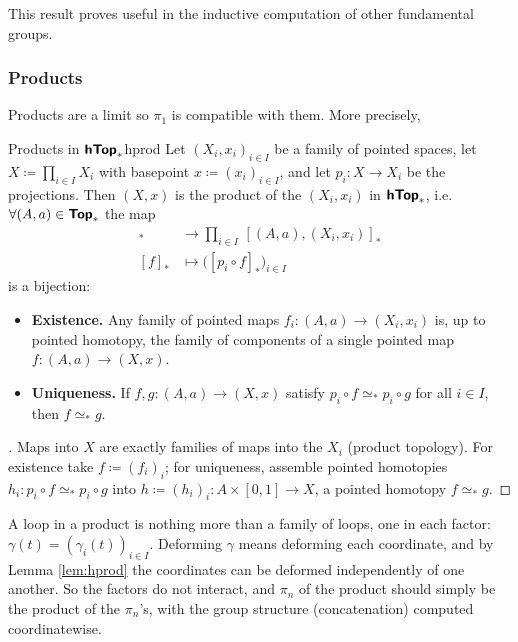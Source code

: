 This result proves useful in the inductive computation of other fundamental groups.

\subsubsection{Products}

Products are a limit so $\pi_1$ is compatible with them. More precisely,

\begin{lemma}{Products in $\bm{\mathsf{hTop}}_*$}{hprod}
  Let $(X_i,x_i)_{i\in I}$ be a family of pointed spaces, let $X\coloneq\prod_{i\in I}X_i$ with basepoint $x\coloneq(x_i)_{i\in I}$, and let $p_i:X\to X_i$ be the projections. Then $(X,x)$ is the product of the $(X_i,x_i)$ in $\bm{\mathsf{hTop}}_*$, i.e.\ $\forall (A,a)\in \bm{\mathsf{Top}}_*$ the map
  \begin{align*}
    [(A,a),(X,x)]_* &\to \prod_{i\in I}\,[(A,a),(X_i,x_i)]_* \\
    [f]_* &\mapsto \big([p_i\circ f]_*\big)_{i\in I}
  \end{align*}
  is a bijection:
  \begin{itemize}
    \item \textbf{Existence.} Any family of pointed maps $f_i:(A,a)\to(X_i,x_i)$ is, up to pointed homotopy, the family of components of a single pointed map $f:(A,a)\to(X,x)$.
    \item \textbf{Uniqueness.} If $f,g:(A,a)\to(X,x)$ satisfy $p_i\circ f\simeq_* p_i\circ g$ for all $i\in I$, then $f\simeq_* g$.
  \end{itemize}
\end{lemma}

\begin{proof}[]
  Maps into $X$ are exactly families of maps into the $X_i$ (product topology). For existence take $f\coloneq(f_i)_i$; for uniqueness, assemble pointed homotopies $h_i:p_i\circ f\simeq_* p_i\circ g$ into $h\coloneq(h_i)_i:A\times[0,1]\to X$, a pointed homotopy $f\simeq_* g$.
\end{proof}

\newpage

A loop in a product is nothing more than a family of loops, one in each factor: $\gamma(t)=(\gamma_i(t))_{i\in I}$. Deforming $\gamma$ means deforming each coordinate, and by Lemma \ref{lem:hprod} the coordinates can be deformed independently of one another. So the factors do not interact, and $\pi_n$ of the product should simply be the product of the $\pi_n$'s, with the group structure (concatenation) computed coordinatewise.

